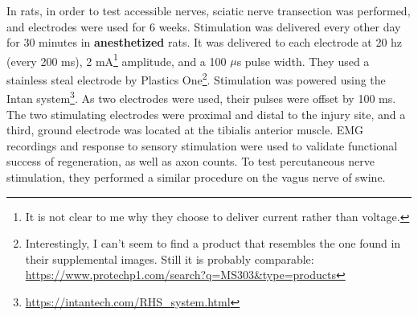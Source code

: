 \documentclass[12pt]{report}
\newcommand{\V}{{\rm V}}
\begin{document}
In rats, in order to test accessible nerves, sciatic nerve transection was performed, and electrodes were used for 6 weeks. Stimulation was delivered every other day for 30 minutes in \textbf{anesthetized} rats. It was delivered to each electrode at 20 hz (every 200 ms), 2 mA\footnote{It is not clear to me why they choose to deliver current rather than voltage.} amplitude, and a 100 $\mu$s pulse width. They used a stainless steal electrode by Plastics One\footnote{Interestingly, I can't seem to find a product that resembles the one found in their supplemental images. Still it is probably comparable: \url{https://www.protechp1.com/search?q=MS303\&type=products}}. Stimulation was powered using the Intan system\footnote{\url{https://intantech.com/RHS_system.html}}. As two electrodes were used, their pulses were offset by 100 ms. The two stimulating electrodes were proximal and distal to the injury site, and a third, ground electrode was located at the tibialis anterior muscle. EMG recordings and response to sensory stimulation were used to validate functional success of regeneration, as well as axon counts. To test percutaneous nerve stimulation, they performed a similar procedure on the vagus nerve of swine.  







\end{document}
